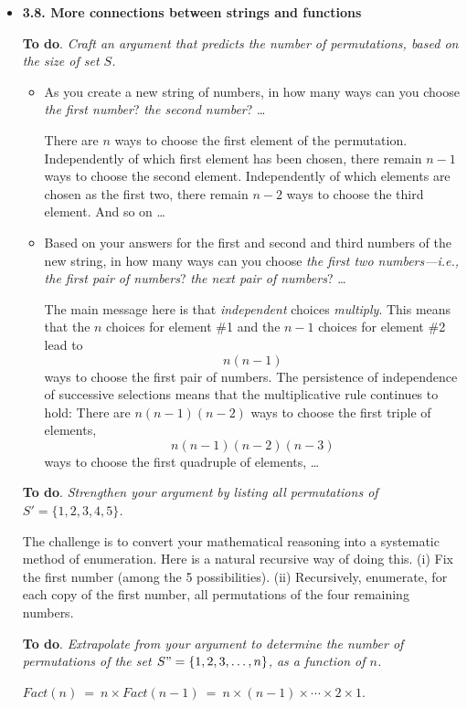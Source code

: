 


\begin{itemize}
\item
{\bf 3.8. More connections between strings and functions}
\medskip

{\bf To do}.  {\em Craft an argument that predicts the number of permutations, based on the size of set $S$.}
\smallskip

  \begin{itemize}
  \item
As you create a new string of numbers, in how many ways can you choose {\em the first number}?  {\em the second number}? \ldots

\smallskip

There are $n$ ways to choose the first element of the permutation.  Independently of which first element has been chosen, there remain $n-1$ ways to choose the second element. Independently of which elements are chosen as the first two, there remain $n-2$ ways to choose the third element.  And so on \ldots

  \medskip\item
Based on your answers for the first and second and third numbers of the new string, in how many ways can you choose {\em the first two numbers---i.e., the first {\em pair} of numbers}?  {\em the next pair of numbers}? \ldots

\smallskip

The main message here is that {\em independent} choices {\em multiply}.  This means that the $n$ choices for element \#1 and the $n-1$ choices for element \#2 lead to
\[ n(n-1) \]
ways to choose the first pair of numbers.  The persistence of independence of successive selections means that the multiplicative rule continues to hold: There are $n(n-1)(n-2)$ ways to choose the first triple of elements,
\[ n(n-1)(n-2)(n-3) \]
ways to choose the first quadruple of elements, \ldots
  \end{itemize}

{\bf To do}. {\em Strengthen your argument by listing all permutations of  $S' =  \{1,2,3,4,5\}$.}

\smallskip

The challenge is to convert your mathematical reasoning into a systematic method of
enumeration.  Here is a natural recursive way of doing this. (i) Fix the first number (among the 5 possibilities).  (ii) Recursively, enumerate, for each copy of the first number, all permutations of the four remaining numbers.

\smallskip

{\bf To do}. {\em Extrapolate from your argument to determine the number of permutations of the set $S" =  \{1,2,3, \ldots, n\}$, as a function of $n$.}

\smallskip

$Fact(n) \ = \ n \times Fact(n-1) \ = \ n \times (n-1) \times \cdots \times 2 \times 1$.

\end{itemize}


